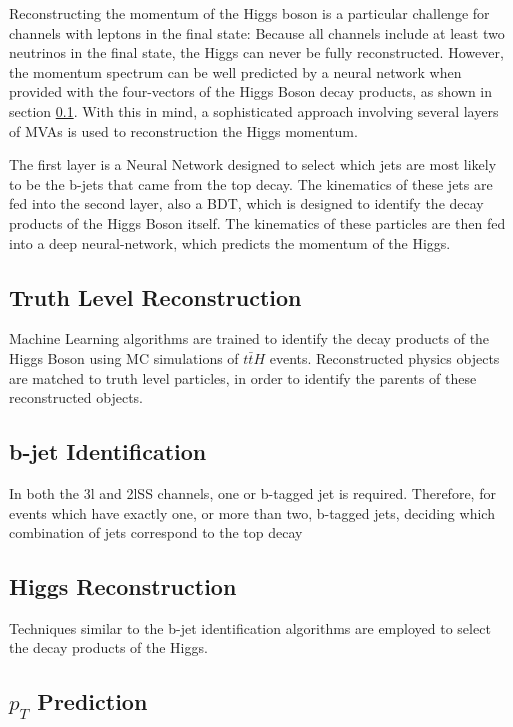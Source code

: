 Reconstructing the momentum of the Higgs boson is a particular challenge for channels with leptons in the final state: Because all channels include at least two neutrinos in the final state, the Higgs can never be fully reconstructed. However, the momentum spectrum can be well predicted by a neural network when provided with the four-vectors of the Higgs Boson decay products, as shown in section \ref{sec:truthLevelReco}. With this in mind, a sophisticated approach involving several layers of MVAs is used to reconstruction the Higgs momentum. 

The first layer is a Neural Network designed to select which jets are most likely to be the b-jets that came from the top decay. The kinematics of these jets are fed into the second layer, also a BDT, which is designed to identify the decay products of the Higgs Boson itself. The kinematics of these particles are then fed into a deep neural-network, which predicts the momentum of the Higgs.

\subsection{Truth Level Reconstruction}
\label{sec:truthLevelReco}

Machine Learning algorithms are trained to identify the decay products of the Higgs Boson using MC simulations of $t\bar{t}H$ events. Reconstructed physics objects are matched to truth level particles, in order to identify the parents of these reconstructed objects. 

\subsection{b-jet Identification}
\label{sec:bjetID}

In both the 3l and 2lSS channels, one or b-tagged jet is required. Therefore, for events which have exactly one, or more than two, b-tagged jets, deciding which combination of jets correspond to the top decay

\subsection{Higgs Reconstruction}
\label{sec:higgsID}

Techniques similar to the b-jet identification algorithms are employed to select the decay products of the Higgs. 

\subsection{$p_T$ Prediction}
\label{sec:ptReco}

